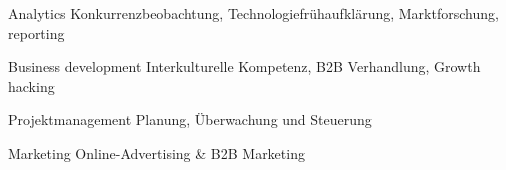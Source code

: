 

\begin{cvskills}
\cvskill
	{Analytics} %
	{Konkurrenzbeobachtung, Technologiefrühaufklärung, Marktforschung, reporting} %

  \cvskill
	{Business development} %
	{Interkulturelle Kompetenz, B2B Verhandlung, Growth hacking} %
	
  \cvskill
	{Projektmanagement} %
	{Planung, Überwachung und Steuerung} %

  \cvskill
	{Marketing} %
	{Online-Advertising \& B2B Marketing} %
\end{cvskills}
